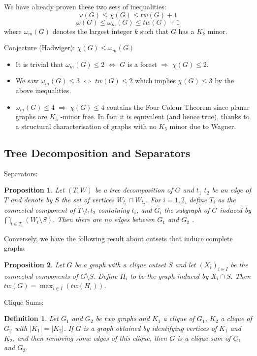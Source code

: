 \documentclass[12pt,a4paper]{article}
\newtheorem{prop}{Proposition}
\newtheorem{definition}{Definition}
\begin{document}
We have already proven these two sets of inequalities:
\[ \omega( G ) \leq \chi( G ) \leq tw( G ) + 1\]
\[ \omega( G ) \leq \omega_m ( G ) \leq tw( G ) + 1\] where $\omega_m ( G )$
denotes the largest integer $k$ such that $G$ has a $K_k$ minor.

Conjecture (Hadwiger): $\chi( G ) \leq \omega_m ( G )$\\
\begin{itemize}
\item It is trivial that $\omega_m ( G ) \leq 2$ $\Leftrightarrow$ $G$ is a
  forest $\Rightarrow$ $\chi( G ) \leq 2$.
\item We saw $\omega_m ( G ) \leq 3$ $\Leftrightarrow$ $tw( G ) \leq 2$ which
  implies $\chi( G ) \leq 3$ by the above inequalities.
\item $\omega_m ( G ) \leq 4$ $\Rightarrow$ $\chi( G ) \leq 4$ contains the Four
  Colour Theorem since planar graphs are $K_5$ -minor free. In fact it is
  equivalent (and hence true), thanks to a structural characterisation of graphs
  with no $K_5$ minor due to Wagner.
\end{itemize}


\subsection{Tree Decomposition and Separators}
Separators:

\begin{prop}
  Let $( T, W )$ be a tree decomposition of $G$ and $t_1$ $t_2$ be an edge of
  $T$ and denote by $S$ the set of vertices $W_{t_1} \cap W_{t_2}$. For
  $i = 1, 2$, define $T_i$ as the connected component of $T \setminus t_1 t_2$
  containing $t_i$, and $G_i$ the subgraph of $G$ induced by
  $\bigcap_{t \in T_i} ( W_t \setminus S )$. Then there are no edges between
  $G_1$ and $G_2$ .
\end{prop}

Conversely, we have the following result about cutsets that induce complete
graphs.

\begin{prop}
  Let $G$ be a graph with a clique cutset $S$ and let $( X_i )_{i \in I}$ be the
  connected components of $G \setminus S$. Define $H_i$ to be the graph induced
  by $X_i \cap S$. Then $tw( G ) = \max_{i \in I} (tw( H_i ))$.
\end{prop}

Clique Sums:

\begin{definition}
  Let $G_1$ and $G_2$ be two graphs and $K_1$ a clique of $G_1$, $K_2$ a clique
  of $G_2$ with $| K_1 | = | K_2 |$. If $G$ is a graph obtained by identifying
  vertices of $K_1$ and $K_2$, and then removing some edges of this clique,
  then $G$ is a clique sum of $G_1$ and $G_2$.
\end{definition}
\end{document}
